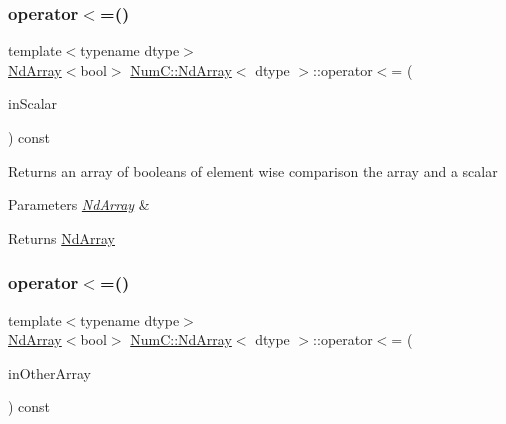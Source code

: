 \subsubsection{\texorpdfstring{operator$<$=()}{operator<=()}\hspace{0.1cm}{\footnotesize\ttfamily [1/2]}}
{\footnotesize\ttfamily template$<$typename dtype$>$ \\
\mbox{\hyperlink{class_num_c_1_1_nd_array}{Nd\+Array}}$<$bool$>$ \mbox{\hyperlink{class_num_c_1_1_nd_array}{Num\+C\+::\+Nd\+Array}}$<$ dtype $>$\+::operator$<$= (\begin{DoxyParamCaption}\item[{dtype}]{in\+Scalar }\end{DoxyParamCaption}) const\hspace{0.3cm}{\ttfamily [inline]}}

Returns an array of booleans of element wise comparison the array and a scalar


\begin{DoxyParams}{Parameters}
{\em \mbox{\hyperlink{class_num_c_1_1_nd_array}{Nd\+Array}}} & \\
\hline
\end{DoxyParams}
\begin{DoxyReturn}{Returns}
\mbox{\hyperlink{class_num_c_1_1_nd_array}{Nd\+Array}} 
\end{DoxyReturn}
\mbox{\label{class_num_c_1_1_nd_array_ab99797f22be77924d4c54a6c54829fa1}} 
\subsubsection{\texorpdfstring{operator$<$=()}{operator<=()}\hspace{0.1cm}{\footnotesize\ttfamily [2/2]}}
{\footnotesize\ttfamily template$<$typename dtype$>$ \\
\mbox{\hyperlink{class_num_c_1_1_nd_array}{Nd\+Array}}$<$bool$>$ \mbox{\hyperlink{class_num_c_1_1_nd_array}{Num\+C\+::\+Nd\+Array}}$<$ dtype $>$\+::operator$<$= (\begin{DoxyParamCaption}\item[{const \mbox{\hyperlink{class_num_c_1_1_nd_array}{Nd\+Array}}$<$ dtype $>$ \&}]{in\+Other\+Array }\end{DoxyParamCaption}) const\hspace{0.3cm}{\ttfamily [inline]}}

